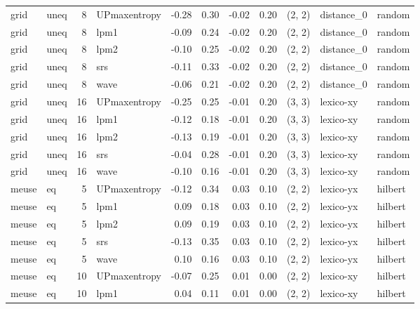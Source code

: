 \begin{tabular}{llrlrrrrlll}
  grid &  uneq &  8 & UPmaxentropy & -0.28 &     0.30 &  -0.02 &       0.20 & (2, 2) &  distance_0 &     random \\
  grid &  uneq &  8 &         lpm1 & -0.09 &     0.24 &  -0.02 &       0.20 & (2, 2) &  distance_0 &     random \\
  grid &  uneq &  8 &         lpm2 & -0.10 &     0.25 &  -0.02 &       0.20 & (2, 2) &  distance_0 &     random \\
  grid &  uneq &  8 &          srs & -0.11 &     0.33 &  -0.02 &       0.20 & (2, 2) &  distance_0 &     random \\
  grid &  uneq &  8 &         wave & -0.06 &     0.21 &  -0.02 &       0.20 & (2, 2) &  distance_0 &     random \\
  grid &  uneq & 16 & UPmaxentropy & -0.25 &     0.25 &  -0.01 &       0.20 & (3, 3) &   lexico-xy &     random \\
  grid &  uneq & 16 &         lpm1 & -0.12 &     0.18 &  -0.01 &       0.20 & (3, 3) &   lexico-xy &     random \\
  grid &  uneq & 16 &         lpm2 & -0.13 &     0.19 &  -0.01 &       0.20 & (3, 3) &   lexico-xy &     random \\
  grid &  uneq & 16 &          srs & -0.04 &     0.28 &  -0.01 &       0.20 & (3, 3) &   lexico-xy &     random \\
  grid &  uneq & 16 &         wave & -0.10 &     0.16 &  -0.01 &       0.20 & (3, 3) &   lexico-xy &     random \\
 meuse &    eq &  5 & UPmaxentropy & -0.12 &     0.34 &   0.03 &       0.10 & (2, 2) &   lexico-yx &    hilbert \\
 meuse &    eq &  5 &         lpm1 &  0.09 &     0.18 &   0.03 &       0.10 & (2, 2) &   lexico-yx &    hilbert \\
 meuse &    eq &  5 &         lpm2 &  0.09 &     0.19 &   0.03 &       0.10 & (2, 2) &   lexico-yx &    hilbert \\
 meuse &    eq &  5 &          srs & -0.13 &     0.35 &   0.03 &       0.10 & (2, 2) &   lexico-yx &    hilbert \\
 meuse &    eq &  5 &         wave &  0.10 &     0.16 &   0.03 &       0.10 & (2, 2) &   lexico-yx &    hilbert \\
 meuse &    eq & 10 & UPmaxentropy & -0.07 &     0.25 &   0.01 &       0.00 & (2, 2) &   lexico-xy &    hilbert \\
 meuse &    eq & 10 &         lpm1 &  0.04 &     0.11 &   0.01 &       0.00 & (2, 2) &   lexico-xy &    hilbert \\

\end{tabular}
